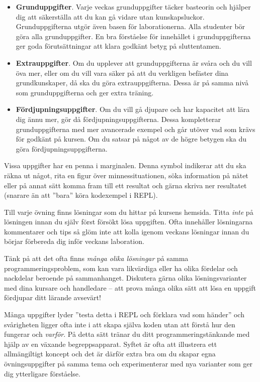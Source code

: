 \begin{itemize}
\item \textbf{Grunduppgifter}. Varje veckas grunduppgifter täcker basteorin och hjälper dig att säkerställa att du kan gå vidare utan kunskapsluckor. Grunduppgifterna utgör även basen för laborationerna. Alla studenter bör göra alla grunduppgifter. En bra förståelse för innehållet i grunduppgifterna ger goda förutsättningar att klara godkänt betyg på sluttentamen.

\item \textbf{Extrauppgifter}. Om du upplever att grunduppgifterna är svåra och du vill öva mer, eller om du vill vara säker på att du verkligen befäster dina grundkunskaper, då ska du göra extrauppgifterna. Dessa är på samma nivå som grunduppgifterna och ger extra träning.

\item \textbf{Fördjupningsuppgifter}. Om du vill gå djupare och har kapacitet att lära dig ännu mer, gör då fördjupningsuppgifterna. Dessa kompletterar grunduppgifterna med mer avancerade exempel och går utöver vad som krävs för godkänt på kursen. Om du satsar på något av de högre betygen ska du göra fördjupningsuppgifterna.
\end{itemize}

\Pen Vissa uppgifter har en penna i marginalen. Denna symbol indikerar att du ska räkna ut något, rita en figur över minnessituationen, söka information på nätet eller på annat sätt komma fram till ett resultat och gärna skriva ner resultatet (snarare än att ''bara'' köra kodexempel i REPL).

Till varje övning finns lösningar som du hittar på kursens hemsida. Titta \emph{inte} på lösningen innan du själv först försökt lösa uppgiften. Ofta innehåller lösningarna kommentarer och tips så glöm inte att kolla igenom veckans lösningar innan du börjar förbereda dig inför veckans  laboration.

Tänk på att det ofta finns \emph{många olika lösningar} på samma programmeringsproblem, som kan vara likvärdiga eller ha olika fördelar och nackdelar beroende på sammanhanget. Diskutera gärna olika lösningsvarianter med dina kursare och handledare -- att prova många olika sätt att lösa en uppgift fördjupar ditt lärande avsevärt!

Många uppgifter lyder ''testa detta i REPL och förklara vad som händer'' och svårigheten ligger ofta inte i att skapa själva koden utan att förstå hur den fungerar och \emph{varför}. På detta sätt tränar du ditt programmeringstänkande med hjälp av en växande begreppsapparat. Syftet är ofta att illustrera ett allmängiltigt koncept och det är därför extra bra om du skapar egna övningsuppgifter på samma tema och experimenterar med nya varianter som ger dig ytterligare förståelse.

